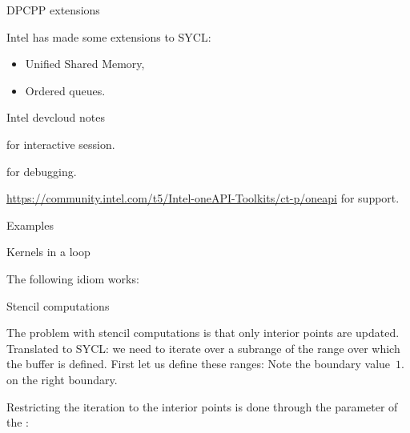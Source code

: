  {DPCPP extensions}

Intel has made some extensions to SYCL:
\begin{itemize}
\item Unified Shared Memory,
\item Ordered queues.
\end{itemize}

 {Intel devcloud notes}

 for interactive session.

 for debugging.

\url{https://community.intel.com/t5/Intel-oneAPI-Toolkits/ct-p/oneapi}
for support.

 {Examples}

 {Kernels in a loop}

The following idiom works:
%

 {Stencil computations}

The problem with stencil computations is that only interior points are updated.
Translated to SYCL: we need to iterate over a subrange of the range over which
the buffer is defined. First let us define these ranges:
%
%
Note the boundary value~$1.$ on the right boundary.

Restricting the iteration to the interior points is done through
the  parameter of the :
%
